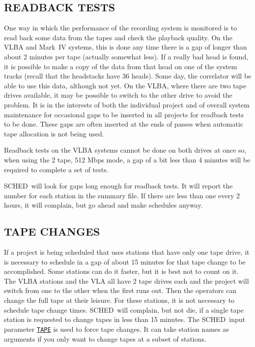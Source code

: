 \documentclass{report}
\newcommand{\schedb}{{\sc SCHED~}}
\begin{document}
\subsection{\label{SSSEC:READBACK}READBACK TESTS}

One way in which the performance of the recording system is monitored
is to read back some data from the tapes and check the playback
quality.  On the VLBA and Mark~IV systems, this is done any time there
is a gap of longer than about 2 minutes per tape (actually somewhat
less).  If a really bad head is found, it is possible to make a copy
of the data from that head on one of the system tracks (recall that
the headstacks have 36 heads).  Some day, the correlator will be able
to use this data, although not yet.  On the VLBA, where there are two
tape drives available, it may be possible to switch to the other drive
to avoid the problem.  It is in the interests of both the individual
project and of overall system maintenance for occasional gaps to be
inserted in all projects for readback tests to be done.  These gaps
are often inserted at the ends of passes when automatic tape
allocation is not being used.

Readback tests on the VLBA systems cannot be done on both drives at
once so, when using the 2 tape, 512 Mbps mode, a gap of a bit less
than 4 minutes will be required to complete a set of tests.

\schedb will look for gaps long enough for readback tests.  It will
report the number for each station in the summary file.  If
there are less than one every 2 hours, it will complain, but go ahead
and make schedules anyway.

\subsection{\label{SSSEC:TAPECHANGE}TAPE CHANGES}

If a project is being scheduled that uses stations that have only one
tape drive, it is necessary to schedule in a gap of about 15 minutes
for that tape change to be accomplished.  Some stations can do it
faster, but it is best not to count on it.  The VLBA stations and the
VLA all have 2 tape drives each and the project will switch from one
to the other when the first runs out.  Then the operators can change
the full tape at their leisure.  For these stations, it is not
necessary to schedule tape change times.  \schedb will complain, but
not die, if a single tape station is requested to change tapes in
less than 15 minutes.  The \schedb input parameter 
{\hyperref[MP:TAPE]{{\tt TAPE}}}
is used to force tape changes.  It can take station names
as arguments if you only want to change tapes at a subset of stations.
\end{document}
